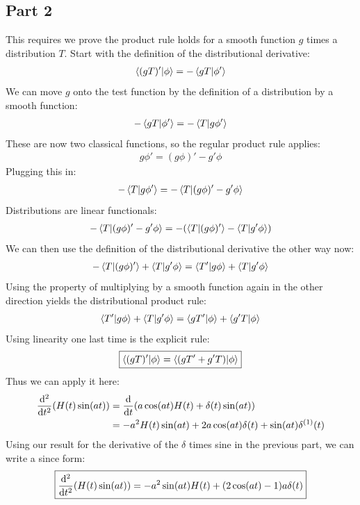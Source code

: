 \documentclass[12pt]{article}
\begin{document}
\subsection*{Part 2}
This requires we prove the product rule holds for a smooth function $g$ times a distribution $T$. Start with the definition of the distributional derivative:
\begin{align*}
  \ip{(gT)'}{\phi}=-\ip{gT}{\phi'}
\end{align*}
We can move $g$ onto the test function by the definition of a distribution by a smooth function:
\begin{align*}
  -\ip{gT}{\phi'}=-\ip{T}{g\phi'}
\end{align*}
These are now two classical functions, so the regular product rule applies:
\begin{align*}
  g\phi'=(g\phi)'-g'\phi
\end{align*}
Plugging this in:
\begin{align*}
  -\ip{T}{g\phi'}=-\ip{T}{(g\phi)'-g'\phi}
\end{align*}
Distributions are linear functionals:
\begin{align*}
  -\ip{T}{(g\phi)'-g'\phi}=-\qty(\ip{T}{(g\phi)'}-\ip{T}{g'\phi})
\end{align*}
We can then use the definition of the distributional derivative the other way now:
\begin{align*}
  -\ip{T}{(g\phi)'}+\ip{T}{g'\phi}=\ip{T'}{g\phi}+\ip{T}{g'\phi}
\end{align*}
Using the property of multiplying by a smooth function again in the other direction yields the distributional product rule:
\begin{align*}
  \ip{T'}{g\phi}+\ip{T}{g'\phi}=\ip{gT'}{\phi}+\ip{g'T}{\phi}
\end{align*}
Using linearity one last time is the explicit rule:
\begin{align*}
  \boxed{\ip{(gT)'}{\phi}=\ip{(gT'+g'T)}{\phi}}
\end{align*}
Thus we can apply it here:
\begin{align*}
  \dv[2]{t}\qty(H(t)\sin(at))&=\dv{t}\qty(a\cos(at)H(t)+\delta(t)\sin(at))\\
  &=-a^2H(t)\sin(at)+2a\cos(at)\delta(t)+\sin(at)\delta^{(1)}(t)
\end{align*}
Using our result for the derivative of the $\delta$ times sine in the previous part, we can write a since form:
\begin{align}
  \boxed{
    \dv[2]{t}\qty(H(t)\sin(at))=-a^2\sin(at)H(t)+(2\cos(at)-1)a\delta(t)
  }
\end{align}
\newpage
\end{document}
